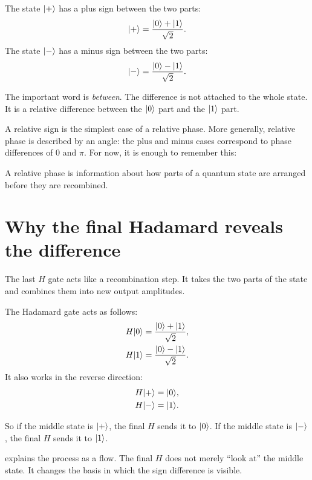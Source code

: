 The state $\lvert +\rangle$ has a plus sign between the two parts:
\begin{equation}
\lvert +\rangle=\frac{\lvert 0\rangle+\lvert 1\rangle}{\sqrt{2}}.
\end{equation}
The state $\lvert -\rangle$ has a minus sign between the two parts:
\begin{equation}
\lvert -\rangle=\frac{\lvert 0\rangle-\lvert 1\rangle}{\sqrt{2}}.
\end{equation}

The important word is \emph{between}. The difference is not attached to the whole state. It is a relative difference between the $\lvert 0\rangle$ part and the $\lvert 1\rangle$ part.

A relative sign is the simplest case of a relative phase. More generally, relative phase is described by an angle: the plus and minus cases correspond to phase differences of $0$ and $\pi$. For now, it is enough to remember this:

\begin{coreidea}
A relative phase is information about how parts of a quantum state are arranged before they are recombined.
\end{coreidea}

\section{Why the final Hadamard reveals the difference}
\label{sec:ch06-final-hadamard}

The last $H$ gate acts like a recombination step. It takes the two parts of the state and combines them into new output amplitudes.

The Hadamard gate acts as follows:
\begin{align}
H\lvert 0\rangle &= \frac{\lvert 0\rangle+\lvert 1\rangle}{\sqrt{2}}, \\
H\lvert 1\rangle &= \frac{\lvert 0\rangle-\lvert 1\rangle}{\sqrt{2}}.
\end{align}
It also works in the reverse direction:
\begin{align}
H\lvert +\rangle &= \lvert 0\rangle, \\
H\lvert -\rangle &= \lvert 1\rangle.
\end{align}

So if the middle state is $\lvert +\rangle$, the final $H$ sends it to $\lvert 0\rangle$. If the middle state is $\lvert -\rangle$, the final $H$ sends it to $\lvert 1\rangle$.

 explains the process as a flow. The final $H$ does not merely ``look at'' the middle state. It changes the basis in which the sign difference is visible.

